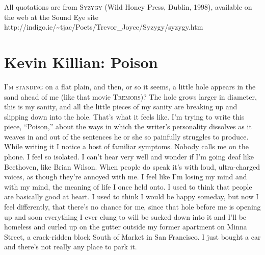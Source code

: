 \documentclass[
]{memoir}
\begin{document}
All quotations are from \textsc{Syzygy} (Wild Honey Press, Dublin,
1998), available on the web at the Sound Eye site
http://indigo.ie/\textasciitilde{}tjac/Poets/Trevor\_Joyce/Syzygy/syzygy.htm

\hypertarget{kevin-killian-poison}{%
\chapter{Kevin Killian: Poison}\label{kevin-killian-poison}}

\lettrine[lines=3, findent=0em, nindent=0.1em, lhang=0]{I}{’m standing}
on a flat plain, and then, or so it seems, a little hole appears in the
sand ahead of me (like that movie \textsc{Tremors})? The hole grows
larger in diameter, this is my sanity, and all the little pieces of my
sanity are breaking up and slipping down into the hole. That's what it
feels like. I'm trying to write this piece, ``Poison,'' about the ways
in which the writer's personality dissolves as it weaves in and out of
the sentences he or she so painfully struggles to produce. While writing
it I notice a host of familiar symptoms. Nobody calls me on the phone. I
feel so isolated. I can't hear very well and wonder if I'm going deaf
like Beethoven, like Brian Wilson. When people do speak it's with loud,
ultra-charged voices, as though they're annoyed with me. I feel like I'm
losing my mind and with my mind, the meaning of life I once held onto. I
used to think that people are basically good at heart. I used to think I
would be happy someday, but now I feel differently, that there's no
chance for me, since that hole before me is opening up and soon
everything I ever clung to will be sucked down into it and I'll be
homeless and curled up on the gutter outside my former apartment on
Minna Street, a crack-ridden block South of Market in San Francisco. I
just bought a car and there's not really any place to park it.
\end{document}
